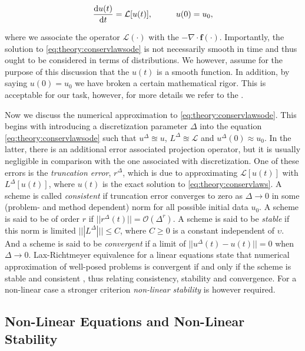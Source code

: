 \documentclass[11pt,a4paper,headinclude=true,DIV=14,BCOR=8mm,chapterprefix,listof=totoc,twoside,openright,abstracton]{scrbook}
\begin{document}
\begin{equation}
\frac{\text{d}u(t)}{\text{d}t} = \mathcal{L}[u(t)], \hspace{10mm} u(0) = u_0,
\label{eq:theory:conservlawsode}
\end{equation}

where we associate the operator $\mathcal{L}(\cdot)$ with the $-\nabla\cdot\boldsymbol{f}(\cdot)$. 
Importantly, the solution to \ref{eq:theory:conservlawsode} is not necessarily smooth in time and thus ought to be considered in terms of distributions. We however, assume for the purpose of this discussion that the $u(t)$ is a smooth function. In addition, by saying $u(0) = u_0$ we have broken a certain mathematical rigor. This is acceptable for our task, however, for more details we refer to the \cite{Kruzkov:1970}. 

Now we discuss the numerical approximation to \ref{eq:theory:conservlawsode}. This begins with introducing a discretization parameter $\Delta$ into the equation \ref{eq:theory:conservlawsode} such that $u^{\Delta}\approxeq u $, $L^{\Delta}\approxeq \mathcal{L}$ and $u^{\Delta}(0) \approx u_0$. In the latter, there is an additional error associated projection operator, but it is usually negligible in comparison with the one associated with discretization. One of these errors is the \textit{truncation error}, $r^{\Delta}$, which is due to approximating $\mathcal{L}[u(t)]$ with $L^{\Delta}[u(t)]$, where $u(t)$ is the exact solution to \ref{eq:theory:conservlaws}. A scheme is called \textit{consistent} if truncation error converges to zero as $\Delta \rightarrow 0$ in some (problem- and method dependent) norm for all possible initial data $u_0$. A scheme is said to be of order $r$ if $|| r^{\Delta}(t) || = \mathcal{O}(\Delta^r)$. A scheme is said to be \textit{stable} if this norm is limited $|||L^{\Delta}||| \leq C$, where $C\geq 0$ is a constant independent of $\upsilon$. And a scheme is said to be \textit{convergent} if a limit of $||u^{\Delta}(t)-u(t)|| = 0$ when $\Delta\rightarrow 0$. Lax-Richtmeyer equivalence for a linear equations state that numerical approximation of well-posed problems is convergent if and only if the scheme is stable and consistent \cite{Lax:1956}, thus relating consistency, stability and convergence. For a non-linear case a stronger criterion \textit{non-linear stability} is however required. 


\subsection{Non-Linear Equations and Non-Linear Stability}
\end{document}
